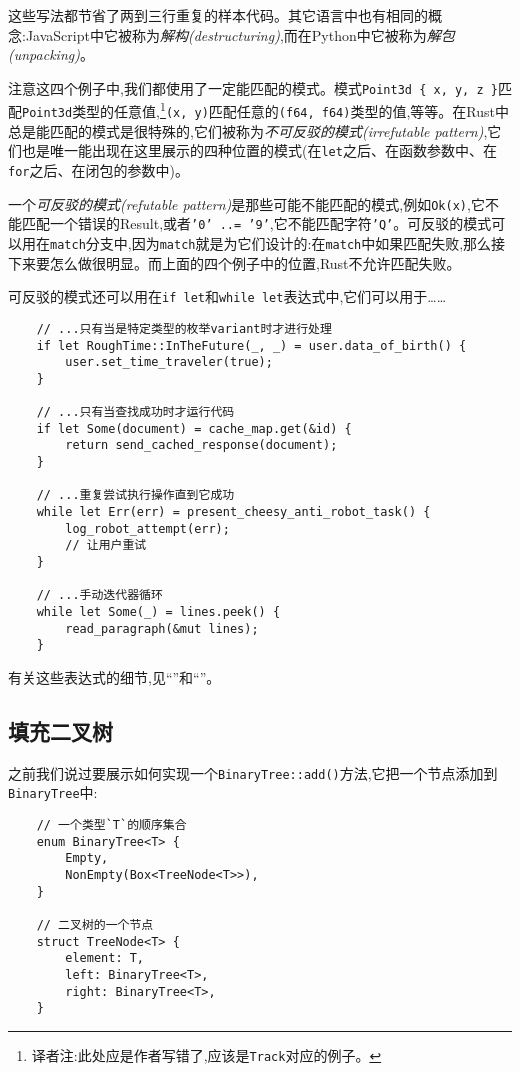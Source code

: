 这些写法都节省了两到三行重复的样本代码。其它语言中也有相同的概念:JavaScript中它被称为\emph{解构(destructuring)},而在Python中它被称为\emph{解包(unpacking)}。

注意这四个例子中,我们都使用了一定能匹配的模式。模式\texttt{Point3d \{ x, y, z \}}匹配\texttt{Point3d}类型的任意值,\footnote{译者注:此处应是作者写错了,应该是\texttt{Track}对应的例子。}\texttt{(x, y)}匹配任意的\texttt{(f64, f64)}类型的值,等等。在Rust中总是能匹配的模式是很特殊的,它们被称为\emph{不可反驳的模式(irrefutable pattern)},它们也是唯一能出现在这里展示的四种位置的模式(在\texttt{let}之后、在函数参数中、在\texttt{for}之后、在闭包的参数中)。

一个\emph{可反驳的模式(refutable pattern)}是那些可能不能匹配的模式,例如\texttt{Ok(x)},它不能匹配一个错误的Result,或者\texttt{'0' ..= '9'},它不能匹配字符\texttt{'Q'}。可反驳的模式可以用在\texttt{match}分支中,因为\texttt{match}就是为它们设计的:在\texttt{match}中如果匹配失败,那么接下来要怎么做很明显。而上面的四个例子中的位置,Rust不允许匹配失败。

可反驳的模式还可以用在\texttt{if let}和\texttt{while let}表达式中,它们可以用于……
\begin{verbatim}
    // ...只有当是特定类型的枚举variant时才进行处理
    if let RoughTime::InTheFuture(_, _) = user.data_of_birth() {
        user.set_time_traveler(true);
    }

    // ...只有当查找成功时才运行代码
    if let Some(document) = cache_map.get(&id) {
        return send_cached_response(document);
    }

    // ...重复尝试执行操作直到它成功
    while let Err(err) = present_cheesy_anti_robot_task() {
        log_robot_attempt(err);
        // 让用户重试
    }

    // ...手动迭代器循环
    while let Some(_) = lines.peek() {
        read_paragraph(&mut lines);
    }
\end{verbatim}

有关这些表达式的细节,见“”和“”。

\subsection{填充二叉树}\label{BinaryTree}
之前我们说过要展示如何实现一个\texttt{BinaryTree::add()}方法,它把一个节点添加到\texttt{BinaryTree}中:
\begin{verbatim}
    // 一个类型`T`的顺序集合
    enum BinaryTree<T> {
        Empty,
        NonEmpty(Box<TreeNode<T>>),
    }

    // 二叉树的一个节点
    struct TreeNode<T> {
        element: T,
        left: BinaryTree<T>,
        right: BinaryTree<T>,
    }
\end{verbatim}

